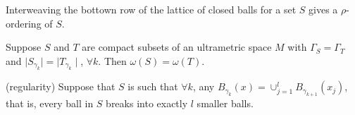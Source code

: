 \begin{corollary*}
Interweaving the bottown row of the lattice of closed balls for a set $S$ gives a $\rho$-ordering of $S$. 
\end{corollary*}

\begin{corollary*}
Suppose $S$ and $T$ are compact subsets of an ultrametric space $M$ with $\Gamma_S = \Gamma_T$ and $\mid S_{\gamma_k}\mid =\mid T_{\gamma_k}\mid$, $\forall k$. Then $\omega(S) = \omega(T)$. 
\end{corollary*}

\begin{corollary*}
(regularity) Suppose that $S$ is such that $\forall k$, any $B_{\gamma_k}(x)=\cup_{j=1}^l B_{\gamma_{k+1}}(x_j)$, that is, every ball in $S$ breaks into exactly $l$ smaller balls. 
\end{corollary*}

                    
